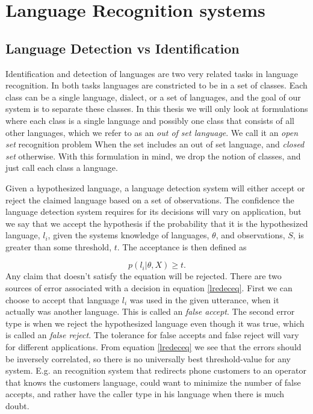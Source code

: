 \chapter{Language Recognition systems}

\section{Language Detection vs Identification}
\label{sect:detvsid}

Identification and detection of languages are two very related tasks in language recognition. In both tasks languages are constricted to be in a set of classes. Each class can be a single language, dialect, or a set of languages, and the goal of our system is to separate these classes. In this thesis we will only look at formulations where each class is a single language and possibly one class that consists of all other languages, which we refer to as an \emph{out of set language}. We call it an \emph{open set} recognition problem When the set includes an out of set language, and \emph{closed set} otherwise. With this formulation in mind, we drop the notion of classes, and just call each class a language. 

Given a hypothesized language, a language detection system will either accept or reject the claimed language based on a set of observations. The confidence the language detection system requires for its decisions will vary on application, but we say that we accept the hypothesis if the probability that it is the hypothesized language, $l_i$, given the systems knowledge of languages, $\theta$, and observations, $S$, is greater than some threshold, $t$. The acceptance is then defined as

\begin{equation}
\label{lredeceq}
p(l_i | \theta, X) \geq t.
\end{equation}
Any claim that doesn't satisfy the equation will be rejected. There are two sources of error associated with a decision in equation \ref{lredeceq}. First we can choose to accept that language $l_i$ was used in the given utterance, when it actually was another language. This is called an \emph{false accept}. The second error type is when we reject the hypothesized language even though it  was true, which is called an  \emph{false reject}. The tolerance for false accepts and false reject will vary for different applications. From equation \ref{lredeceq} we see that the errors should be inversely correlated, so there is no universally best threshold-value for any system. E.g. an recognition system that redirects phone customers to an operator that knows the customers language, could want to minimize the number of false accepts, and rather have the caller type in his language when there is much doubt.

